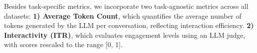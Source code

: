     

Besides task-specific metrics, we incorporate two task-agnostic metrics across all datasets: \textbf{1) Average Token Count}, which quantifies the average number of tokens generated by the LLM per conversation, reflecting interaction efficiency. \textbf{2) Interactivity (ITR)}, which evaluates engagement levels using an LLM judge, with scores rescaled to the range [0, 1]. 



